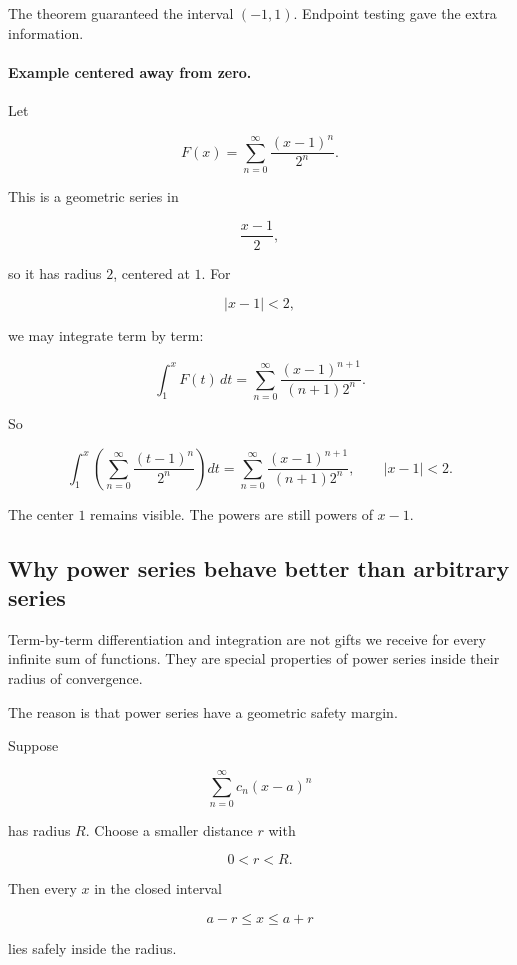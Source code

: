 The theorem guaranteed the interval \((-1,1)\).  Endpoint testing gave the extra
information.

\paragraph{Example centered away from zero.}
Let

\[
F(x)=\sum_{n=0}^{\infty}\frac{(x-1)^n}{2^n}.
\]

This is a geometric series in

\[
\frac{x-1}{2},
\]

so it has radius \(2\), centered at \(1\).  For

\[
|x-1|<2,
\]

we may integrate term by term:

\[
\int_1^x F(t)\,dt
=
\sum_{n=0}^{\infty}
\frac{(x-1)^{n+1}}{(n+1)2^n}.
\]

So

\[
\boxed{
\int_1^x \left(\sum_{n=0}^{\infty}\frac{(t-1)^n}{2^n}\right)dt
=
\sum_{n=0}^{\infty}
\frac{(x-1)^{n+1}}{(n+1)2^n},
\qquad |x-1|<2.
}
\]

The center \(1\) remains visible.  The powers are still powers of \(x-1\).

\subsection{Why power series behave better than arbitrary series}
\label{subsec:why-power-series-behave-better}

Term-by-term differentiation and integration are not gifts we receive for every infinite
sum of functions.  They are special properties of power series inside their radius of
convergence.

The reason is that power series have a geometric safety margin.

Suppose

\[
\sum_{n=0}^{\infty} c_n(x-a)^n
\]

has radius \(R\).  Choose a smaller distance \(r\) with

\[
0<r<R.
\]

Then every \(x\) in the closed interval

\[
a-r\le x\le a+r
\]

lies safely inside the radius.

